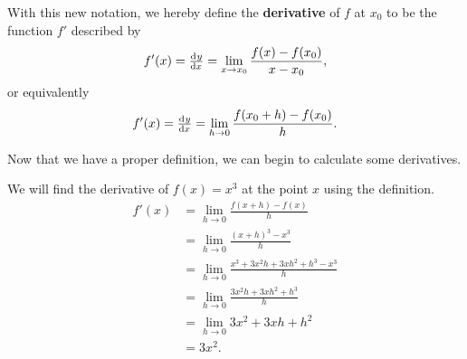 With this new notation, we hereby define the \textbf{derivative} of $ f $ at $ x_0 $ to be the function $ f' $ described by
\begin{displaymath}
  f'(x) = \od{y}{x} = \lim_{x \to x_0} \frac{f(x) - f(x_0)}{x - x_0},
\end{displaymath}
or equivalently
\begin{displaymath}
  f'(x) = \od{y}{x} = \lim_{h \to 0} \frac{f(x_0 + h) - f(x_0)}{h}.
\end{displaymath}

Now that we have a proper definition, we can begin to calculate some derivatives.

\begin{ex}
  We will find the derivative of $ f(x) = x^3 $ at the point $ x $ using the definition.
  \begin{align*}
    f'(x) &= \lim_{h \to 0} \frac{f(x + h) - f(x)}{h}\\
          &= \lim_{h \to 0} \frac{(x + h)^3 - x^3}{h}\\
          &= \lim_{h \to 0} \frac{x^3 + 3x^2h + 3xh^2 + h^3 - x^3}{h}\\
          &= \lim_{h \to 0} \frac{3x^2 h + 3xh^2 + h^3}{h}\\
          &= \lim_{h \to 0} 3x^2 + 3xh + h^2\\
          &= 3x^2.
  \end{align*}
\end{ex}

\clearpage
